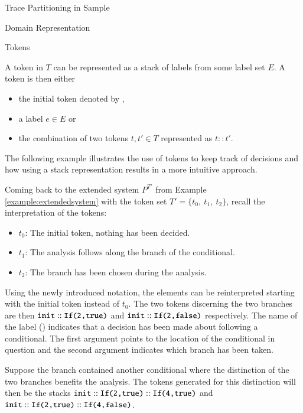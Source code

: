\begin{chapter}{Trace Partitioning in Sample}
\begin{section}{Domain Representation}
\begin{subsection}{Tokens}
			\begin{definition}[Token]
				A token in $T$ can be represented as a stack of labels from some label set $E$. A token is then either
				\begin{itemize}
					\item the initial token denoted by \emph{},
					\item a label $e \in E$ or
					\item the combination of two tokens $t,t' \in T$ represented as $t::t'$.
				\end{itemize}
			\end{definition}

			The following example illustrates the use of tokens to keep track of decisions and how using a stack representation results in a more intuitive approach.

			\begin{example}[Tokens]
				Coming back to the extended system $P^{T'}$ from Example \ref{example:extendedsystem} with the token set $T' = \{t_0,\ t_1,\ t_2\}$, recall the interpretation of the tokens:
				\begin{itemize}
					\item $t_0$: The initial token, nothing has been decided.
					\item $t_1$: The analysis follows along the  branch of the conditional.
					\item $t_2$: The  branch has been chosen during the analysis.
				\end{itemize}
				Using the newly introduced notation, the elements can be reinterpreted starting with the initial token  instead of $t_0$. The two tokens discerning the two branches are then $\texttt{init}::\texttt{If(2,true)}$ and $\texttt{init}::\texttt{If(2,false)}$ respectively. The name of the label () indicates that a decision has been made about following a conditional. The first argument points to the location of the conditional in question and the second argument indicates which branch has been taken.

				Suppose the  branch contained another conditional where the distinction of the two branches benefits the analysis. The tokens generated for this distinction will then be the stacks $\texttt{init}::\texttt{If(2,true)}::\texttt{If(4,true)}$ and $\texttt{init}::\texttt{If(2,true)}::\texttt{If(4,false)}$.
				\exampleend
			\end{example}
		\end{subsection}


\end{section}
\end{chapter}
